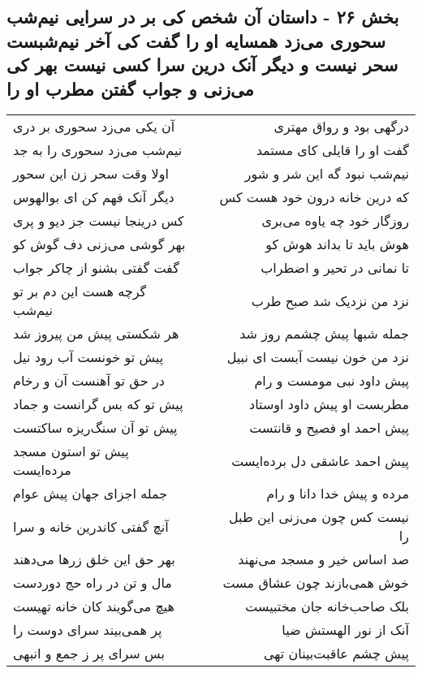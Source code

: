 \begin{center}
\section*{بخش ۲۶ - داستان آن شخص کی بر در سرایی نیم‌شب سحوری می‌زد همسایه او را گفت کی آخر نیم‌شبست سحر نیست و دیگر آنک درین سرا کسی نیست بهر کی می‌زنی و جواب گفتن مطرب او را}
\label{sec:sh026}
\begin{longtable}{l p{0.5cm} r}
آن یکی می‌زد سحوری بر دری
&&
درگهی بود و رواق مهتری
\\
نیم‌شب می‌زد سحوری را به جد
&&
گفت او را قایلی کای مستمد
\\
اولا وقت سحر زن این سحور
&&
نیم‌شب نبود گه این شر و شور
\\
دیگر آنک فهم کن ای بوالهوس
&&
که درین خانه درون خود هست کس
\\
کس درینجا نیست جز دیو و پری
&&
روزگار خود چه یاوه می‌بری
\\
بهر گوشی می‌زنی دف گوش کو
&&
هوش باید تا بداند هوش کو
\\
گفت گفتی بشنو از چاکر جواب
&&
تا نمانی در تحیر و اضطراب
\\
گرچه هست این دم بر تو نیم‌شب
&&
نزد من نزدیک شد صبح طرب
\\
هر شکستی پیش من پیروز شد
&&
جمله شبها پیش چشمم روز شد
\\
پیش تو خونست آب رود نیل
&&
نزد من خون نیست آبست ای نبیل
\\
در حق تو آهنست آن و رخام
&&
پیش داود نبی مومست و رام
\\
پیش تو که بس گرانست و جماد
&&
مطربست او پیش داود اوستاد
\\
پیش تو آن سنگ‌ریزه ساکتست
&&
پیش احمد او فصیح و قانتست
\\
پیش تو استون مسجد مرده‌ایست
&&
پیش احمد عاشقی دل برده‌ایست
\\
جمله اجزای جهان پیش عوام
&&
مرده و پیش خدا دانا و رام
\\
آنچ گفتی کاندرین خانه و سرا
&&
نیست کس چون می‌زنی این طبل را
\\
بهر حق این خلق زرها می‌دهند
&&
صد اساس خیر و مسجد می‌نهند
\\
مال و تن در راه حج دوردست
&&
خوش همی‌بازند چون عشاق مست
\\
هیچ می‌گویند کان خانه تهیست
&&
بلک صاحب‌خانه جان مختبیست
\\
پر همی‌بیند سرای دوست را
&&
آنک از نور الهستش ضیا
\\
بس سرای پر ز جمع و انبهی
&&
پیش چشم عاقبت‌بینان تهی
\\

\end{longtable}
\end{center}
